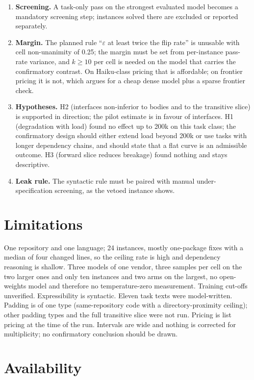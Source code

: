 \documentclass[10pt]{article}
\newcommand{\eps}{\varepsilon}
\begin{document}
\begin{enumerate}
\item \textbf{Screening.} A task-only pass on the strongest evaluated model becomes a mandatory screening step; instances solved there are excluded or reported separately.
\item \textbf{Margin.} The planned rule ``$\eps$ at least twice the flip rate'' is unusable with cell non-unanimity of 0.25; the margin must be set from per-instance pass-rate variance, and $k \ge 10$ per cell is needed on the model that carries the confirmatory contrast. On Haiku-class pricing that is affordable; on frontier pricing it is not, which argues for a cheap dense model plus a sparse frontier check.
\item \textbf{Hypotheses.} H2 (interfaces non-inferior to bodies and to the transitive slice) is supported in direction; the pilot estimate is in favour of interfaces. H1 (degradation with load) found no effect up to 200k on this task class; the confirmatory design should either extend load beyond 200k or use tasks with longer dependency chains, and should state that a flat curve is an admissible outcome. H3 (forward slice reduces breakage) found nothing and stays descriptive.
\item \textbf{Leak rule.} The syntactic rule must be paired with manual under-specification screening, as the vetoed instance shows.
\end{enumerate}

\section{Limitations}

One repository and one language; 24 instances, mostly one-package fixes with a median of four changed lines, so the ceiling rate is high and dependency reasoning is shallow. Three models of one vendor, three samples per cell on the two larger ones and only ten instances and two arms on the largest, no open-weights model and therefore no temperature-zero measurement. Training cut-offs unverified. Expressibility is syntactic. Eleven task texts were model-written. Padding is of one type (same-repository code with a directory-proximity ceiling); other padding types and the full transitive slice were not run. Pricing is list pricing at the time of the run. Intervals are wide and nothing is corrected for multiplicity; no confirmatory conclusion should be drawn.

\section{Availability}
\end{document}
